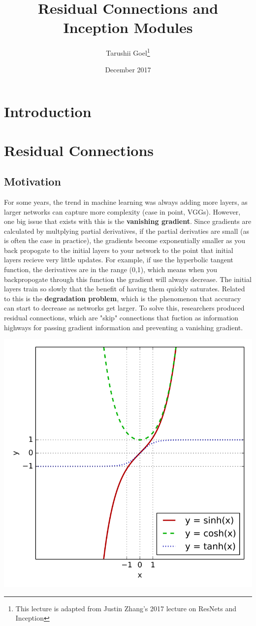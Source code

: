 \documentclass{article}
\title{Residual Connections and Inception Modules}
\author{Tarushii Goel\footnote{This lecture is adapted from Justin Zhang's 2017 lecture on ResNets and Inception}}
\date{December 2017}
\begin{document}
\maketitle

\section{Introduction}


\section{Residual Connections}
\subsection{Motivation}
For some years, the trend in machine learning was always adding more layers, as larger networks can capture more complexity (case in point, VGGs). However, one big issue that exists with this is the {\bf vanishing gradient}. Since gradients are calculated by multplying partial derivatives, if the partial derivaties are small (as is often the case in practice), the gradients become exponentially smaller as you back propogate to the initial layers to your network to the point that initial layers recieve very little updates. For example, if use the hyperbolic tangent function, the derivatives are in the range (0,1), which means when you backpropogate through this function the gradient will always decrease. The initial layers train so slowly that the benefit of having them quickly saturates. Related to this is the {\bf degradation problem}, which is the phenomenon that accuracy can start to decrease as networks get larger. To solve this, researchers produced residual connections, which are "skip" connections that fuction as information highways for passing gradient information and preventing a vanishing gradient. 
\begin{center}
\includegraphics[scale=0.2]{tanh.png}
\end{center}
\end{document}

